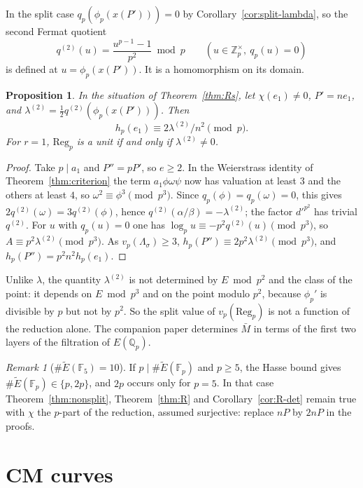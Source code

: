 \documentclass[11pt,a4paper]{amsart}
\newcommand{\F}{\mathbb{F}}
\newcommand{\Qp}{\mathbb{Q}_p}
\newcommand{\Zp}{\mathbb{Z}_p}
\newcommand{\Fp}{\mathbb{F}_p}
\newcommand{\Reg}{\mathrm{Reg}}
\newcommand{\Et}{\widetilde{E}}
\newcommand{\qp}{q_p}
\theoremstyle{plain}
\newtheorem{proposition}[theorem]{Proposition}
\theoremstyle{definition}
\theoremstyle{remark}
\newtheorem{remark}[theorem]{Remark}
\begin{document}
In the split case $\qp(\phi_p(x(P')))=0$ by Corollary~\ref{cor:split-lambda}, so the second Fermat quotient
\[
q^{(2)}(u)=\frac{u^{p-1}-1}{p^2}\bmod p\qquad(u\in\Zp^\times,\ \qp(u)=0)
\]
is defined at $u=\phi_p(x(P'))$. It is a homomorphism on its domain.

\begin{proposition}\label{prop:Rs-const}
In the situation of Theorem~\ref{thm:Rs}, let $\chi(e_1)\ne0$, $P'=ne_1$, and $\lambda^{(2)}=\frac12q^{(2)}(\phi_p(x(P')))$. Then
\[
h_p(e_1)\equiv2\lambda^{(2)}/n^2\pmod p .
\]
For $r=1$, $\Reg_p$ is a unit if and only if $\lambda^{(2)}\ne0$.
\end{proposition}

\begin{proof}
Take $p\mid a_1$ and $P''=pP'$, so $e\ge2$. In the Weierstrass identity of Theorem~\ref{thm:criterion} the term $a_1\phi\omega\psi$ now has valuation at least $3$ and the others at least $4$, so $\omega^2\equiv\phi^3\pmod{p^3}$. Since $\qp(\phi)=\qp(\omega)=0$, this gives $2q^{(2)}(\omega)=3q^{(2)}(\phi)$, hence $q^{(2)}(\alpha/\beta)=-\lambda^{(2)}$; the factor $d'^{p^2}$ has trivial $q^{(2)}$. For $u$ with $\qp(u)=0$ one has $\log_pu\equiv-p^2q^{(2)}(u)\pmod{p^3}$, so $A\equiv p^2\lambda^{(2)}\pmod{p^3}$. As $v_p(\Lambda_\sigma)\ge3$, $h_p(P'')\equiv2p^2\lambda^{(2)}\pmod{p^3}$, and $h_p(P'')=p^2n^2h_p(e_1)$.
\end{proof}

Unlike $\lambda$, the quantity $\lambda^{(2)}$ is not determined by $E\bmod p^2$ and the class of the point: it depends on $E\bmod p^3$ and on the point modulo $p^2$, because $\phi_p'$ is divisible by $p$ but not by $p^2$. So the split value of $v_p(\Reg_p)$ is not a function of the reduction alone. The companion paper \cite{Comp} determines $\bar M$ in terms of the first two layers of the filtration of $E(\Qp)$.

\begin{remark}[$\#\Et(\F_5)=10$]
If $p\mid\#\Et(\Fp)$ and $p\ge5$, the Hasse bound gives $\#\Et(\Fp)\in\{p,2p\}$, and $2p$ occurs only for $p=5$. In that case Theorem~\ref{thm:nonsplit}, Theorem~\ref{thm:R} and Corollary~\ref{cor:R-det} remain true with $\chi$ the $p$-part of the reduction, assumed surjective: replace $nP$ by $2nP$ in the proofs.
\end{remark}

\section{CM curves}\label{sec:CM}
\end{document}
